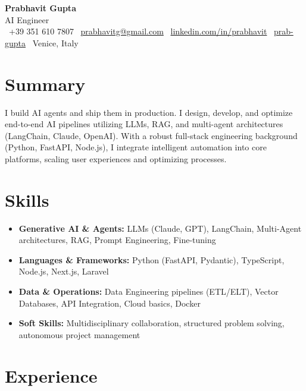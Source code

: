 \documentclass[a4paper,10pt]{article}
\begin{document}
\begin{center}
 {\Huge\bfseries Prabhavit Gupta}\\[3pt]
 {\color{accent}\large AI Engineer}\\[5pt]
 \faPhone\ +39 351 610 7807 \quad
 \faEnvelope\ \href{mailto:prabhavitg@gmail.com}{prabhavitg@gmail.com} \quad
 \faLinkedin\ \href{https://www.linkedin.com/in/prabhavit/}{linkedin.com/in/prabhavit} \quad
 \faGithub\ \href{https://github.com/prab-gupta}{prab-gupta} \quad
 \faMapMarker*\ Venice, Italy
\end{center}

\section{Summary}
I build AI agents and ship them in production. I design, develop, and optimize end-to-end AI pipelines utilizing LLMs, RAG, and multi-agent architectures (LangChain, Claude, OpenAI). With a robust full-stack engineering background (Python, FastAPI, Node.js), I integrate intelligent automation into core platforms, scaling user experiences and optimizing processes.

\section{Skills}
\begin{itemize}
 \item \textbf{Generative AI \& Agents:} LLMs (Claude, GPT), LangChain, Multi-Agent architectures, RAG, Prompt Engineering, Fine-tuning
 \item \textbf{Languages \& Frameworks:} Python (FastAPI, Pydantic), TypeScript, Node.js, Next.js, Laravel
 \item \textbf{Data \& Operations:} Data Engineering pipelines (ETL/ELT), Vector Databases, API Integration, Cloud basics, Docker
 \item \textbf{Soft Skills:} Multidisciplinary collaboration, structured problem solving, autonomous project management
\end{itemize}

\section{Experience}
\end{document}
